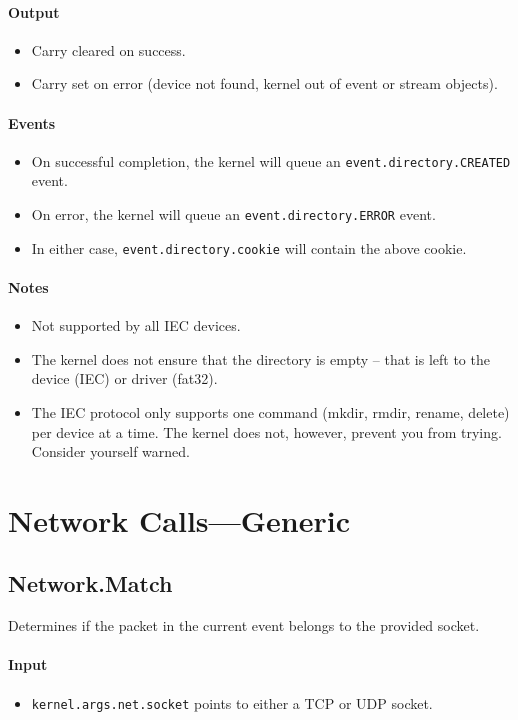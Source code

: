 \paragraph{Output}
\begin{itemize}
\item Carry cleared on success.
\item Carry set on error (device not found, kernel out of event or stream objects).
\end{itemize}

\paragraph{Events}
\begin{itemize}
\item On successful completion, the kernel will queue an \verb+event.directory.CREATED+ event.
\item On error, the kernel will queue an \verb+event.directory.ERROR+ event.
\item In either case, \verb+event.directory.cookie+ will contain the above cookie.
\end{itemize}

\paragraph{Notes}
\begin{itemize}
\item Not supported by all IEC devices.
\item The kernel does not ensure that the directory is empty -- that is left to the device (IEC) or driver (fat32).
\item The IEC protocol only supports one command (mkdir, rmdir, rename, delete) per device at a time.  The kernel does not, however, prevent you from trying.  Consider yourself warned.
\end{itemize}


\section*{Network Calls---Generic}

\subsection*{Network.Match}
Determines if the packet in the current event belongs to the provided socket.

\paragraph{Input}
\begin{itemize}
\item \verb+kernel.args.net.socket+ points to either a TCP or UDP socket.
\end{itemize}

